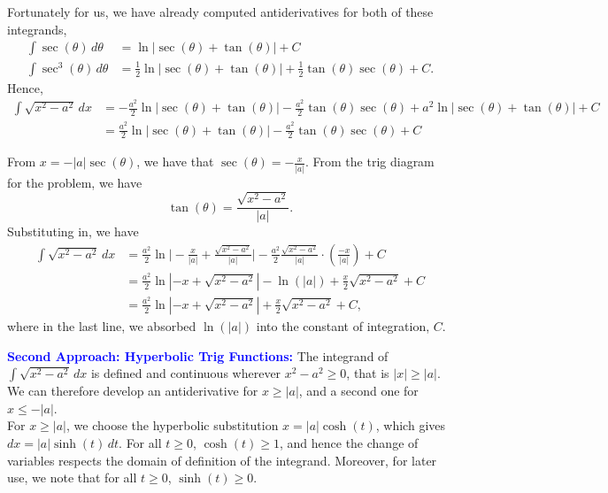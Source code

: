 Fortunately for us, we have already computed antiderivatives for both of these integrands,
\begin{align*}
     \int \sec(\theta) \, d\theta &=  \ln|\sec(\theta) + \tan(\theta)| + C\\
      \int \sec^3(\theta) \, d\theta &=  \frac{1}{2}  \ln|\sec(\theta) + \tan(\theta)| + \frac{1}{2} \tan(\theta) \sec(\theta) +C.
\end{align*}
Hence, 
\begin{align*}
    \int \sqrt{x^2 - a^2} \, dx &=  - \frac{a^2}{2}  \ln|\sec(\theta) + \tan(\theta)| - \frac{a^2}{2} \tan(\theta) \sec(\theta) + a^2 \ln|\sec(\theta) + \tan(\theta)| +C \\[1em]
    &=   \frac{a^2}{2}  \ln|\sec(\theta) + \tan(\theta)| - \frac{a^2}{2} \tan(\theta) \sec(\theta)  +C 
\end{align*}

From $x = -|a| \sec(\theta)$, we have that $\sec(\theta) = - \frac{x}{|a|}$. From the trig diagram for the problem, we have
$$\tan(\theta)  = \frac{\sqrt{x^2 - a^2}}{|a|}.$$
Substituting in, we have 
\begin{align*}
\int \sqrt{x^2 - a^2} \, dx &= \frac{a^2}{2}  \ln \bigg|- \frac{x}{|a|} +  \frac{\sqrt{x^2 - a^2}}{|a|} \bigg| - \frac{a^2}{2} \frac{\sqrt{x^2 - a^2}}{|a|} \cdot \left(\frac{-x}{|a|}\right) +C \\[1em]
 &= \frac{a^2}{2}  \ln |-x + \sqrt{x^2 - a^2}| - \ln(|a|) + \frac{x}{2} \sqrt{x^2 - a^2} +C \\[1em]
 & = \frac{a^2}{2}  \ln |-x + \sqrt{x^2 - a^2}|+ \frac{x}{2} \sqrt{x^2 - a^2} +C,  
\end{align*}
where in the last line, we absorbed $ \ln(|a|)$ into the constant of integration, $C$.

\bigskip
\textcolor{blue}{\bf Second Approach: Hyperbolic Trig Functions:} The integrand of \( \int \sqrt{x^2 - a^2} \, dx \) is defined and continuous wherever \( x^2 - a^2 \ge 0 \), that is \( |x| \ge |a| \). We can therefore develop an antiderivative for $x \ge |a|$, and a second one for $x \le -|a|$.\\

For $x \ge |a|$, we choose the hyperbolic substitution \( x = |a| \cosh(t) \), which gives \( dx = |a| \sinh(t) \, dt \). For all $t\ge0$, $\cosh(t)\ge 1$, and hence the change of variables respects the domain of definition of the integrand. Moreover, for later use, we note that for all $t\ge 0$, $\sinh(t) \ge 0$.\\

